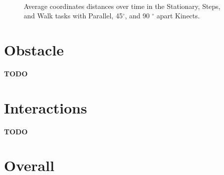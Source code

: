 \begin{figure}[!h]
{  } \\

  \caption{Average coordinates distances over time in the Stationary, Steps, and Walk tasks with Parallel, 45$^{\circ}$, and 90 $^{\circ}$ apart Kinects.}

  \label{fig:results_three_joints_over_time}
\end{figure}

\section{Obstacle}
\label{sec:results_obstacle}

\textbf{TODO}

\section{Interactions}
\label{sec:results_interactions}

\textbf{TODO}

\section{Overall}
\label{sec:results_overall}

